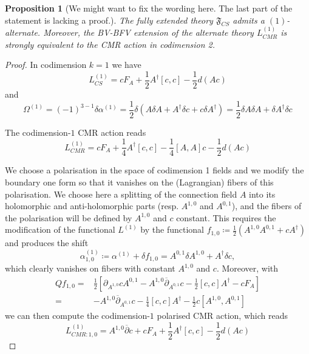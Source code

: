 \documentclass[a4paper,reqno]{amsart}
\newtheorem{proposition}[definition]{Proposition}
\begin{document}
\begin{proposition}[{\color{blue}We might want to fix the wording here. The last part of the statement is lacking a proof.}]
The fully extended theory $\mathfrak{F}_{CS}$ admits a $(1)$-alternate. Moreover, the BV-BFV extension of the alternate theory $L^{(1)}_{CMR}$ is strongly equivalent to the CMR action in codimension 2.
\end{proposition}

\begin{proof}
In codimension $k=1$ we have
\begin{equation}
L^{(1)}_{CS}= cF_A + \frac12 A^\dag [c,c] - \frac12 d(Ac)
\end{equation}
and 
\begin{equation}
\Omega^{(1)} = (-1)^{3-1}\delta \alpha^{(1)} = \frac12\delta \left( A\delta A + A^\dag \delta c + c\delta A^\dag\right) =  \frac12 \delta A\delta A + \delta A^\dag\delta c
\end{equation}

The codimension-$1$ CMR action reads
\begin{equation}
L^{(1)}_{CMR}=cF_A + \frac14 A^\dag[c,c] - \frac14[A,A]c - \frac12 d(Ac)
\end{equation}

We choose a polarisation in the space of codimension 1 fields and we modify the boundary one form so that it vanishes on the (Lagrangian) fibers of this polarisation. We choose here a splitting of the connection field $A$ into its holomorphic and anti-holomorphic parts (resp. $A^{1,0}$ and $A^{0,1}$), and the fibers of the polarisation will be defined by $A^{1,0}$ and $c$ constant. This requires the modification of the functional $L^{(1)}$ by the functional $f_{1,0}\coloneqq \frac12\left( A^{1,0}A^{0,1} + cA^\dag \right)$ and produces the shift 
$$\alpha^{(1)}_{1,0}\coloneqq \alpha^{(1)} + \delta f_{1,0}= A^{0,1}\delta A^{1,0} + A^\dag \delta c,$$
which clearly vanishes on fibers with constant $A^{1,0}$ and $c$. Moreover, with
\begin{align*}
Qf_{1,0} =&  \frac12\left[ \partial_{A^{1,0}}c A^{0,1} - A^{1,0}\overline{\partial}_{A^{0,1}}c - \frac12[c,c] A^\dag - cF_A\right] \\
=& - A^{1,0}\overline{\partial}_{A^{0,1}}c - \frac14[c,c]A^\dag - \frac12 c[A^{1,0},A^{0,1}]
\end{align*}
we can then compute the codimension-$1$ polarised CMR action, which reads
\begin{equation}
L^{(1)}_{CMR:1,0}=A^{1,0} \overline{\partial} c + cF_A + \frac12A^\dag[c,c] - \frac12d(Ac)
\end{equation}


\end{proof}
\end{document}
